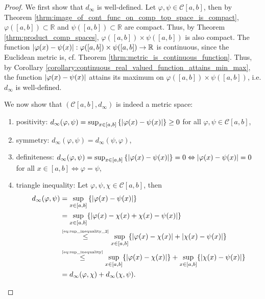 \begin{proof}
	We first show that $d_{\infty}$ is well-defined. Let $\varphi, \psi\in \mathcal C[a, b]$, then by Theorem \ref{thrm:image_of_cont_func_on_comp_top_space_is_compact}, $\varphi([a, b])\subset\mathbb R$ and $\psi([a, b])\subset\mathbb R$ are compact. Thus, by Theorem \ref{thrm:product_comp_spaces}, $\varphi([a, b])\times \psi([a, b])$ is also compact. The function $\left\vert  \varphi(x) - \psi(x)  \right\vert: \varphi([a, b])\times \psi([a, b]) \to\mathbb R$ is continuous, since the Euclidean metric is, cf. Theorem \ref{thrm:metric_is_continuous_function}. Thus, by Corollary \ref{corollary:continuous_real_valued_function_attains_min_max}, the function $\left\vert  \varphi(x) - \psi(x)  \right\vert$ attains its maximum on $\varphi([a, b])\times \psi([a, b])$, i.e. $d_{\infty}$ is well-defined.

	We now show that $(\mathcal C[a, b], d_{\infty})$ is indeed a metric space:
	\begin{enumerate}
		\item positivity: $d_{\infty}(\varphi, \psi) = \sup_{x\in [a, b]}\left\{ \left\vert \varphi(x) - \psi(x) \right\vert \right\}\geq 0$ for all $\varphi, \psi\in\mathcal C[a, b]$,
		\item symmetry: $d_{\infty}(\varphi, \psi) = d_{\infty}(\psi, \varphi)$,
		\item definiteness: $d_{\infty}(\varphi, \psi) = \sup_{x\in [a, b]}\left\{ \left\vert \varphi(x) - \psi(x) \right\vert \right\} = 0 \Leftrightarrow \left\vert \varphi(x) - \psi(x) \right\vert = 0$ for all $x\in[a, b]\Leftrightarrow\varphi = \psi$,
		\item triangle inequality: Let $\varphi, \psi, \chi\in \mathcal C[a, b]$, then 
		\begin{align*}
			d_{\infty}(\varphi, \psi) &= \sup_{x\in [a, b]}\left\{ \left\vert \varphi(x) - \psi(x) \right\vert \right\} 
			\\ &= \sup_{x\in [a, b]}\{\left\vert \varphi(x) - \chi(x) + \chi(x) - \psi(x) \right\vert\}
			\\ &\overset{\tiny\eqref{eq:sup_inequality_2}}{\leq} \sup_{x\in [a, b]}\{\left\vert \varphi(x) - \chi(x) \right\vert + \left\vert \chi(x) - \psi(x) \right\vert\}
			\\ &\overset{\tiny\eqref{eq:sup_inequality}}{\leq} \sup_{x\in [a, b]}\{\left\vert \varphi(x) - \chi(x) \right\vert\} + \sup_{x\in[a, b]}\{\left\vert \chi(x) - \psi(x) \right\vert\} 
			\\ &= d_{\infty}(\varphi, \chi) + d_{\infty}(\chi, \psi).
		\end{align*}
	\end{enumerate}
	

\end{proof}
